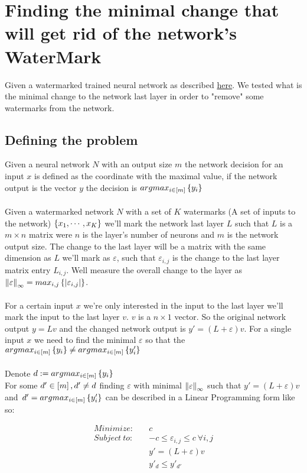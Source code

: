 \documentclass{article}
\begin{document}
\section{Finding the minimal change that will get rid of the network's WaterMark}
Given a watermarked trained neural network as described \href{https://www.usenix.org/system/files/conference/usenixsecurity18/sec18-adi.pdf}{here}. We tested what is the minimal change to the network last layer in order to "remove" some watermarks from the network. 
\subsection{Defining the problem}
Given a neural network $N$ with an output size $m$ the network decision for an input $x$ is defined as the coordinate with the maximal value, if the network output is the vector $y$ the decision is $argmax_{i\in \left[m\right]} \left\lbrace y_i\right\rbrace$
\\\\
Given a watermarked network $N$ with a set of $K$ watermarks (A set of inputs to the network) $\left\lbrace x_1,\cdots,x_K\right\rbrace$ we'll mark the network last layer $L$ such that $L$ is a $m\times n$ matrix were $n$ is the layer's number of neurons and $m$ is the network output size.
The change to the last layer will be a matrix with the same dimension as $L$ we'll mark as $\varepsilon$, such that $\varepsilon_{i,j}$ is the change to the last layer matrix entry $L_{i,j}$. Well measure the overall change to the layer as $\left\lVert\varepsilon\right\rVert_{\infty} = max_{i,j}\left\lbrace \left\lvert\varepsilon_{i,j}\right\rvert\right\rbrace$.
\\\\
For a certain input $x$ we're only interested in the input to the last layer we'll mark the input to the last layer $v$. $v$ is a $n\times 1$ vector.
So the original network output $y = Lv$ and the changed network output is $y' = (L+\varepsilon)v$. For a single input $x$ we need to find the minimal $\varepsilon$ so that the $argmax_{i\in\left[m\right]}\left\lbrace y_i\right\rbrace\neq argmax_{i\in\left[m\right]}\left\lbrace y'_i\right\rbrace$
\\\\ 
Denote $d := argmax_{i\in \left[m\right]} \left\lbrace y_i\right\rbrace$ \\
For some $d'\in\left[m\right],d'\neq d$ finding $\varepsilon$ with minimal $\left\lVert\varepsilon\right\rVert_{\infty}$ such that $y' = (L+\varepsilon)v\,$ and $\,d' = argmax_{i\in\left[m\right]}\left\lbrace y'_i\right\rbrace$ can be described in a Linear Programming form like so:

\begin{align*}
    Minimize:\quad & c \\
    Subject\ to:\quad & -c \leq\varepsilon_{i,j}\leq c\ \forall i,j\\
    & y'=(L+\varepsilon)v \\
    & y'_d \leq y'_{d'}\\
\end{align*}
\end{document}
